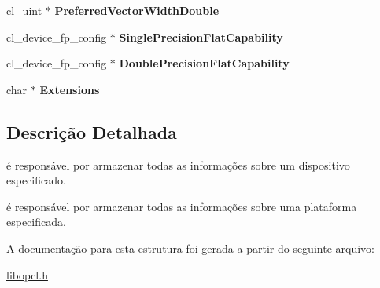\begin{DoxyCompactItemize}
\item 
\hypertarget{structdevices_a36376e35408549d958ffce74baec74f9}{}\label{structdevices_a36376e35408549d958ffce74baec74f9} 
cl\+\_\+uint $\ast$ {\bfseries Preferred\+Vector\+Width\+Double}
\item 
\hypertarget{structdevices_af2485ecd861d278d13ea124342d95f36}{}\label{structdevices_af2485ecd861d278d13ea124342d95f36} 
cl\+\_\+device\+\_\+fp\+\_\+config $\ast$ {\bfseries Single\+Precision\+Flat\+Capability}
\item 
\hypertarget{structdevices_a9f9941ab957970afe7995713675e0c16}{}\label{structdevices_a9f9941ab957970afe7995713675e0c16} 
cl\+\_\+device\+\_\+fp\+\_\+config $\ast$ {\bfseries Double\+Precision\+Flat\+Capability}
\item 
\hypertarget{structdevices_a04797e250a09482a400749add9f8862e}{}\label{structdevices_a04797e250a09482a400749add9f8862e} 
char $\ast$ {\bfseries Extensions}
\end{DoxyCompactItemize}


\subsection{Descrição Detalhada}
é responsável por armazenar todas as informações sobre um dispositivo especificado.

é responsável por armazenar todas as informações sobre uma plataforma especificada. 

A documentação para esta estrutura foi gerada a partir do seguinte arquivo\+:\begin{DoxyCompactItemize}
\item 
\hyperlink{libopcl_8h}{libopcl.\+h}\end{DoxyCompactItemize}
